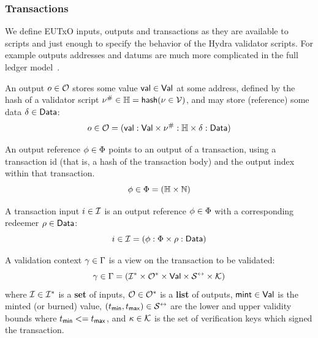 \subsubsection{Transactions}

We define EUTxO inputs, outputs and transactions as they are available to
scripts and just enough to specify the behavior of the Hydra validator scripts.
For example outputs addresses and datums are much more complicated in the full
ledger model~\cite{eutxo-2, ledger-shelley-spec}.

\begin{definition}[Outputs]
	An output $o \in \mathcal{O}$ stores some value $\mathsf{val} \in \mathsf{Val}$ at some address,
	defined by the hash of a validator script $\nu^{\#} \in \mathbb{H} = \mathsf{hash}(\nu \in \mathcal{V})$,
	and may store (reference) some data $\delta \in \mathsf{Data}$:
	\[
		o \in \mathcal{O} = (\mathsf{val} : \mathsf{Val} \times \nu^{\#} : \mathbb{H} \times \delta : \mathsf{Data})
	\]
\end{definition}

\begin{definition}
	An output reference $\phi \in \Phi$ points to an output of a
	transaction, using a transaction id (that is, a hash of the transaction body)
	and the output index within that transaction.
	\[
		\phi \in \Phi = (\mathbb{H} \times \mathbb{N})
	\]
\end{definition}

\begin{definition}[Inputs]
	A transaction input $i \in \mathcal{I}$ is an output reference
	$\phi \in \Phi$ with a corresponding redeemer $\rho \in \mathsf{Data}$:
	\[
		i \in \mathcal{I} = (\phi : \Phi \times \rho : \mathsf{Data})
	\]
\end{definition}

\begin{definition}
	A validation context $\gamma \in \Gamma$ is a view on the transaction
	to be validated:
	\[
		\gamma \in \Gamma = (\mathcal{I}^* \times \mathcal{O}^* \times \mathsf{Val} \times \mathcal{S}^{\leftrightarrow} \times \mathcal{K})
	\]
	where $\mathcal{I} \in \mathcal{I}^*$ is a \textbf{set} of inputs,
	$\mathcal{O} \in \mathcal{O}^*$ is a \textbf{list} of outputs,
	$\mathsf{mint} \in \mathsf{Val}$ is the minted (or burned) value,
	$(t_{\mathsf{min}}, t_{\mathsf{max}}) \in \mathcal{S}^{\leftrightarrow}$ are the lower and upper
	validity bounds where $t_{\mathsf{min}} <= t_{\mathsf{max}}$, and
	$\kappa \in \mathcal{K}$ is the set of verification keys which signed the
	transaction.
\end{definition}

